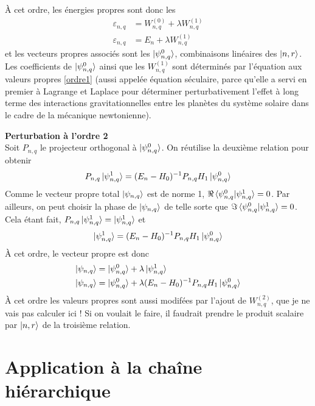 \documentclass[11pt]{article}
\begin{document}
À cet ordre, les énergies propres sont donc les 
\begin{align*}
	\varepsilon_{n,q} &= W^{(0)}_{n,q} + \lambda W^{(1)}_{n,q} \\
	\varepsilon_{n,q} &= E_n + \lambda W^{(1)}_{n,q}
\end{align*}
et les vecteurs propres associés sont les $\ket{\psi^0_{n,q}}$, combinaisons linéaires des $\ket{n,r}$. Les coefficients de $\ket{\psi^0_{n,q}}$ ainsi que les $W^{(1)}_{n,q}$ sont déterminés par l'équation aux valeurs propres \eqref{ordre1} (aussi appelée équation séculaire, parce qu'elle a servi en premier à Lagrange et Laplace pour déterminer perturbativement l'effet à long terme des interactions gravitationnelles entre les planètes du système solaire dans le cadre de la mécanique newtonienne).

\textbf{Perturbation à l'ordre 2}\\
Soit $P_{n,q}$ le projecteur orthogonal à $\ket{\psi^0_{n,q}}$. On réutilise la deuxième relation pour obtenir
\begin{equation}
	P_{n,q} \ket{\psi^1_{n,q}} = (E_n - H_0)^{-1} P_{n,q} H_1 \ket{\psi^0_{n,q}}
\end{equation}
Comme le vecteur propre total $\ket{\psi_{n,q}}$ est de norme 1, $\Re \braket{\psi^0_{n,q} | \psi^1_{n,q}} = 0$. Par ailleurs, on peut choisir la phase de $\ket{\psi_{n,q}}$ de telle sorte que $\Im \braket{\psi^0_{n,q} | \psi^1_{n,q}} = 0$. 
Cela étant fait, $P_{n,q} \ket{\psi^1_{n,q}} = \ket{\psi^1_{n,q}}$ et
\begin{equation}
\label{ordre2}
	\ket{\psi^1_{n,q}} = (E_n - H_0)^{-1} P_{n,q} H_1 \ket{\psi^0_{n,q}}
\end{equation}
À cet ordre, le vecteur propre est donc
\begin{align*}
	\ket{\psi_{n,q}} &= \ket{\psi^0_{n,q}} + \lambda \ket{\psi^1_{n,q}}  \\
	\ket{\psi_{n,q}} &= \ket{\psi^0_{n,q}} + \lambda (E_n - H_0)^{-1} P_{n,q} H_1 \ket{\psi^0_{n,q}}
\end{align*}
À cet ordre les valeurs propres sont aussi modifées par l'ajout de $W^{(2)}_{n,q}$, que je ne vais pas calculer ici ! Si on voulait le faire, il faudrait prendre le produit scalaire par $\ket{n,r}$ de la troisième relation.

\section{Application à la chaîne hiérarchique}
\end{document}
